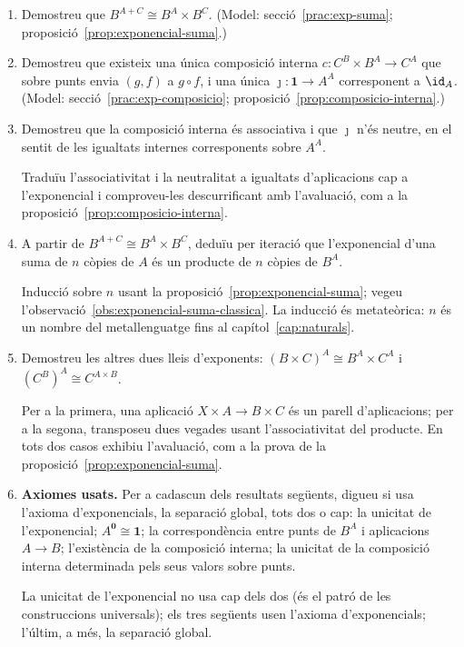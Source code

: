 \begin{enumerate}[resume]
  \item Demostreu que \(B^{A+C}\cong B^{A}\times B^{C}\). (Model: secció~\ref{prac:exp-suma}; proposició~\ref{prop:exponencial-suma}.)

  \item Demostreu que existeix una única composició interna \(c\colon C^{B}\times B^{A}\to C^{A}\) que sobre punts envia \((g,f)\) a \(g\circ f\), i una única \(\jmath\colon\mathbf1\to A^{A}\) corresponent a \(\id_A\). (Model: secció~\ref{prac:exp-composicio}; proposició~\ref{prop:composicio-interna}.)

  \item Demostreu que la composició interna és associativa i que \(\jmath\) n'és neutre, en el sentit de les igualtats internes corresponents sobre \(A^{A}\). \begin{indicacio}Traduïu l'associativitat i la neutralitat a igualtats d'aplicacions cap a l'exponencial i comproveu-les descurrificant amb l'avaluació, com a la proposició~\ref{prop:composicio-interna}.\end{indicacio}

  \item A partir de \(B^{A+C}\cong B^{A}\times B^{C}\), deduïu per iteració que l'exponencial d'una suma de \(n\) còpies de \(A\) és un producte de \(n\) còpies de \(B^{A}\). \begin{indicacio}Inducció sobre \(n\) usant la proposició~\ref{prop:exponencial-suma}; vegeu l'observació~\ref{obs:exponencial-suma-classica}. La inducció és metateòrica: \(n\) és un nombre del metallenguatge fins al capítol~\ref{cap:naturals}.\end{indicacio}

  \item Demostreu les altres dues lleis d'exponents: \((B\times C)^{A}\cong B^{A}\times C^{A}\) i \((C^{B})^{A}\cong C^{A\times B}\). \begin{indicacio}Per a la primera, una aplicació \(X\times A\to B\times C\) és un parell d'aplicacions; per a la segona, transposeu dues vegades usant l'associativitat del producte. En tots dos casos exhibiu l'avaluació, com a la prova de la proposició~\ref{prop:exponencial-suma}.\end{indicacio}

  \item \textbf{Axiomes usats.} Per a cadascun dels resultats següents, digueu si usa l'axioma d'exponencials, la separació global, tots dos o cap: la unicitat de l'exponencial; \(A^{\mathbf0}\cong\mathbf1\); la correspondència entre punts de \(B^A\) i aplicacions \(A\to B\); l'existència de la composició interna; la unicitat de la composició interna determinada pels seus valors sobre punts. \begin{indicacio}La unicitat de l'exponencial no usa cap dels dos (és el patró de les construccions universals); els tres següents usen l'axioma d'exponencials; l'últim, a més, la separació global.\end{indicacio}
\end{enumerate}
